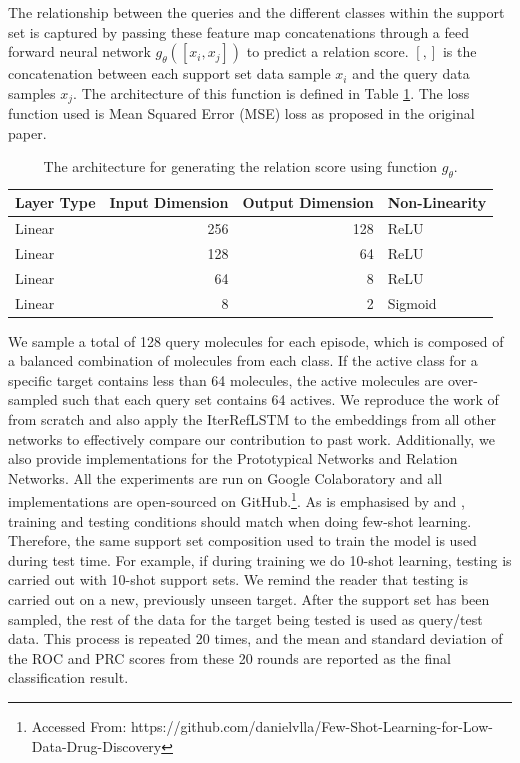 The relationship between the queries and the different classes within the support set is captured by passing these feature map concatenations through a feed forward neural network $g_\theta([x_i, x_j])$ to predict a relation score. $[ , ]$ is the concatenation between each support set data sample $x_i$ and the query data samples $x_j$. The architecture of this function is defined in Table \ref{table:relation-neural-net}. The loss function used is Mean Squared Error (MSE) loss as proposed in the original paper.

\begin{table}[h]
\centering
\begin{tabular}{@{}lrrl@{}}
\hline
Layer Type & Input Dimension & Output Dimension & Non-Linearity \\
\hline
Linear & 256 & 128 & ReLU \\
Linear & 128 & 64 & ReLU \\
Linear & 64 & 8 & ReLU \\
Linear & 8 & 2 & Sigmoid \\
\hline
\end{tabular}
\caption{The architecture for generating the relation score using function $g_\theta$.}
\label{table:relation-neural-net}
\end{table}

We sample a total of 128 query molecules for each episode, which is composed of a balanced combination of molecules from each class. If the active class for a specific target contains less than 64 molecules, the active molecules are over-sampled such that each query set contains 64 actives. We reproduce the work of \citet{altae2017low} from scratch and also apply the IterRefLSTM to the embeddings from all other networks to effectively compare our contribution to past work. Additionally, we also provide implementations for the Prototypical Networks and Relation Networks. All the experiments are run on Google Colaboratory and all implementations are open-sourced on GitHub.\footnote{Accessed From: https://github.com/danielvlla/Few-Shot-Learning-for-Low-Data-Drug-Discovery}. As is emphasised by \citet{vinyals2016matching} and \citet{snell2017prototypical}, training and testing conditions should match when doing few-shot learning. Therefore, the same support set composition used to train the model is used during test time. For example, if during training we do 10-shot learning, testing is carried out with 10-shot support sets. We remind the reader that testing is carried out on a new, previously unseen target. After the support set has been sampled, the rest of the data for the target being tested is used as query/test data. This process is repeated 20 times, and the mean and standard deviation of the ROC and PRC scores from these 20 rounds are reported as the final classification result.

